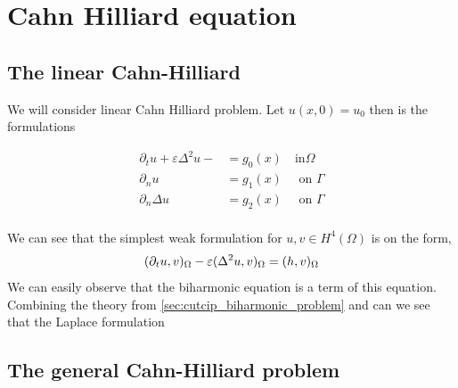 
\newpage
\section{Cahn Hilliard equation }%
\label{sec:cahn_hilliard_equation}




\subsection{The linear Cahn-Hilliard}%

We will consider linear Cahn Hilliard problem. Let $ u( x,0) =  u_{0}$ then is the formulations

\begin{equation}
\label{eq:ch_exact}
    \begin{split}
        \partial _{t} u  + \varepsilon \Delta^2   u -   & =  g_{0}(x)  \quad \text{in} \Omega \\
        \partial _{n} u & =  g_{1}(x)  \quad \text{ on } \Gamma \\
         \partial _{n} \Delta u & = g_{2}(x)  \quad \text{ on } \Gamma  \\
    \end{split}
\end{equation}



We can see that the simplest weak formulation for $u,v \in H^{4}( \Omega ) $ is on the form,
\[
( \partial _{t}u, v )_{\Omega }  - \varepsilon ( \Delta^2 u, v)_{\Omega } = ( h,v)_{\Omega }   \\
\]
We can easily observe that the biharmonic equation is a term of this equation. Combining the theory from \ref{sec:cutcip_biharmonic_problem} and can we see that the Laplace formulation



\subsection{The general Cahn-Hilliard problem}%
\label{sub:the_problem}

